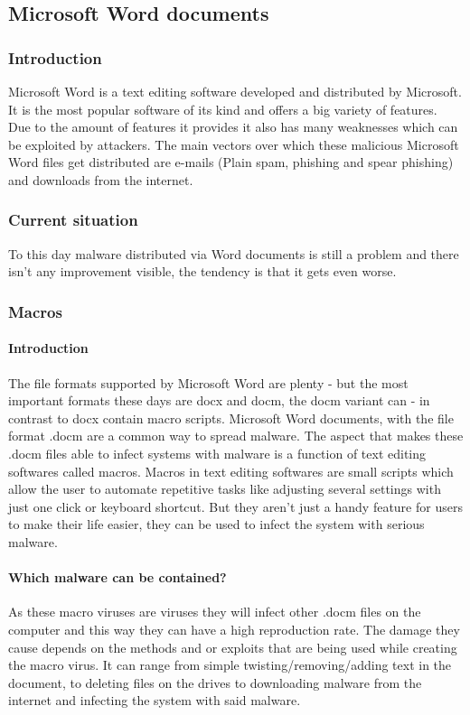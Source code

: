 \documentclass[a4paper,10pt]{article}
\begin{document}
\subsection{Microsoft Word documents}
\subsubsection{Introduction}
Microsoft Word is a text editing software developed and distributed by Microsoft. It is the most popular software of its kind and offers a big variety of features. Due to the amount of features it provides it also has many weaknesses which can be exploited by attackers. The main vectors over which these malicious Microsoft Word files get distributed are e-mails (Plain spam, phishing and spear phishing)\cite{7762928} and downloads from the internet.

\subsubsection{Current situation}
To this day malware distributed via Word documents is still a problem and there isn't any improvement visible, the tendency is that it gets even worse.


\subsubsection{Macros}
\paragraph*{Introduction}
The file formats supported by Microsoft Word are plenty - but the most important formats these days are docx and docm, the docm variant can - in contrast to docx contain macro scripts. Microsoft Word documents, with the file format .docm are a common way to spread malware. The aspect that makes these .docm files able to infect systems with malware is a function of text editing softwares called macros. Macros in text editing softwares are small scripts which allow the user to automate repetitive tasks like adjusting several settings with just one click or keyboard shortcut. But they aren't just a handy feature for users to make their life easier, they can be used to infect the system with serious malware.
\paragraph*{Which malware can be contained?}
As these macro viruses are viruses they will infect other .docm files on the computer and this way they can have a high reproduction rate. The damage they cause depends on the methods and or exploits that are being used while creating the macro virus. It can range from simple twisting/removing/adding text in the document, to deleting files on the drives to downloading malware from the internet and infecting the system with said malware.
\end{document}
